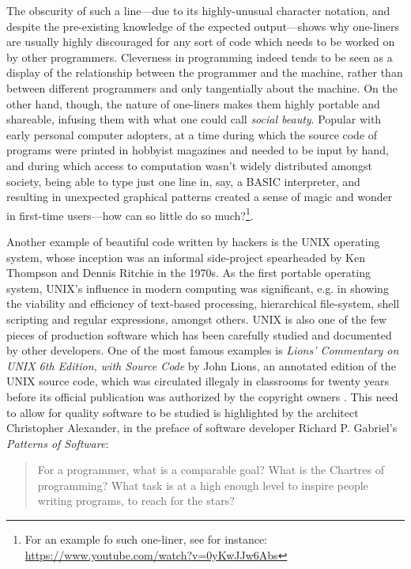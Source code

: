 The obscurity of such a line—due to its highly-unusual character notation, and despite the pre-existing knowledge of the expected output—shows why one-liners are usually highly discouraged for any sort of code which needs to be worked on by other programmers. Cleverness in programming indeed tends to be seen as a display of the relationship between the programmer and the machine, rather than between different programmers and only tangentially about the machine. On the other hand, though, the nature of one-liners makes them highly portable and shareable, infusing them with what one could call \emph{social beauty}. Popular with early personal computer adopters, at a time during which the source code of programs were printed in hobbyist magazines and needed to be input by hand, and during which access to computation wasn't widely distributed amongst society, being able to type just one line in, say, a BASIC interpreter, and resulting in unexpected graphical patterns created a sense of magic and wonder in first-time users—how can so little do so much?\footnote{For an example fo such one-liner, see for instance: \url{https://www.youtube.com/watch?v=0yKwJJw6Abs}}.

Another example of beautiful code written by hackers is the UNIX operating system, whose inception was an informal side-project spearheaded by Ken Thompson and Dennis Ritchie in the 1970s. As the first portable operating system, UNIX's influence in modern computing was significant, e.g. in showing the viability and efficiency of text-based processing, hierarchical file-system, shell scripting and regular expressions, amongst others. UNIX is also one of the few pieces of production software which has been carefully studied and documented by other developers. One of the most famous examples is \emph{Lions' Commentary on UNIX 6th Edition, with Source Code} by John Lions, an annotated edition of the UNIX source code, which was circulated illegaly in classrooms for twenty years before its official publication was authorized by the copyright owners \citep{lions_lions_1996}. This need to allow for quality software to be studied is highlighted by the architect Christopher Alexander, in the preface of software developer Richard P. Gabriel's \textit{Patterns of Software}:

\begin{quote}
  For a programmer, what is a comparable goal? What is the Chartres of programming? What task is at a high enough level to inspire people writing programs, to reach for the stars? \citep{gabriel_patterns_1998}
\end{quote}

